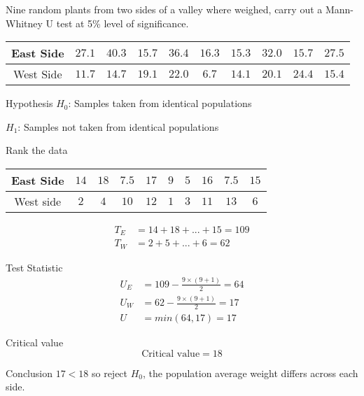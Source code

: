         \begin{example}
        {
        Nine random plants from two sides of a valley where weighed, carry out a Mann-Whitney U test at 5\% level of significance.
        
        \begin{center}
        \begin{tabular}{c|c|c|c|c|c|c|c|c|c}
            East Side & $$27.1$$ & $$40.3$$ & $$15.7$$ & $$36.4$$ & $$16.3$$ & $$15.3$$ & $$32.0$$ & $$15.7$$ & $$27.5$$ \\
            \hline
            West Side & $$11.7$$ & $$14.7$$ & $$19.1$$ & $$22.0$$ & $$6.7$$ & $$14.1$$ & $$20.1$$ & $$24.4$$ & $$15.4$$
        \end{tabular}
        \end{center}
        }
        
        \begin{step}{Hypothesis}
        $H_0$: Samples taken from identical populations
        
        $H_1$: Samples not taken from identical populations
        \end{step}
        
        \begin{step}{Rank the data}
        \begin{center}
        \begin{tabular}{c|c|c|c|c|c|c|c|c|c}
        East Side & $14$ & $18$ & $7.5$ & $17$ & $9$ & $5$ & $16$ & $7.5$ & $15$  \\
        \hline
        West side & $2$  & $4$  & $10$  & $12$ & $1$ & $3$ & $11$ & $13$  & $6$   \\
        \end{tabular}
        \end{center}
        
        \begin{align*}
        T_E &= 14 + 18 + ... + 15 = 109\\
        T_W &= 2 + 5 + ... + 6 = 62
        \end{align*}
        \end{step}

        \begin{step}{Test Statistic}
        \begin{align*}
        U_E &= 109 - \frac{9 \times (9 + 1)}{2} = 64\\
        U_W &= 62 - \frac{9 \times (9 + 1)}{2} = 17\\
        U &= min(64, 17) = 17
        \end{align*}
        \end{step}

        \begin{step}{Critical value}
        $$\text{Critical value} = 18$$
        \end{step}

        \begin{step}{Conclusion}
        $17 < 18$ so reject $H_0$, the population average weight differs across each side.
        \end{step}
        \end{example}
    
